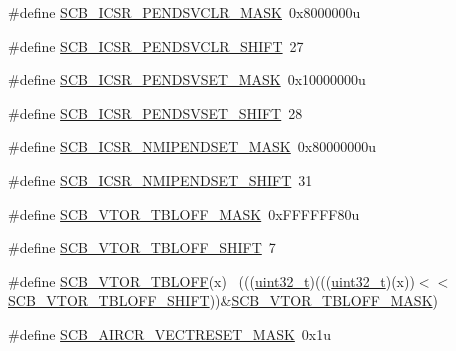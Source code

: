 \begin{DoxyCompactItemize}
\item 
\#define \hyperlink{group___s_c_b___register___masks_ga12a45a6af09cbefd431d033d8411220e}{S\+C\+B\+\_\+\+I\+C\+S\+R\+\_\+\+P\+E\+N\+D\+S\+V\+C\+L\+R\+\_\+\+M\+A\+SK}~0x8000000u
\item 
\#define \hyperlink{group___s_c_b___register___masks_gad7a5894ad98606b443ab6f1b52f2bc36}{S\+C\+B\+\_\+\+I\+C\+S\+R\+\_\+\+P\+E\+N\+D\+S\+V\+C\+L\+R\+\_\+\+S\+H\+I\+FT}~27
\item 
\#define \hyperlink{group___s_c_b___register___masks_ga5ed59a5d03a7d25ef76aa9d92e25e4a5}{S\+C\+B\+\_\+\+I\+C\+S\+R\+\_\+\+P\+E\+N\+D\+S\+V\+S\+E\+T\+\_\+\+M\+A\+SK}~0x10000000u
\item 
\#define \hyperlink{group___s_c_b___register___masks_ga76cddcbf872958b00237c662309251d2}{S\+C\+B\+\_\+\+I\+C\+S\+R\+\_\+\+P\+E\+N\+D\+S\+V\+S\+E\+T\+\_\+\+S\+H\+I\+FT}~28
\item 
\#define \hyperlink{group___s_c_b___register___masks_gab2a6cb5708895a81ec8826b8fa546145}{S\+C\+B\+\_\+\+I\+C\+S\+R\+\_\+\+N\+M\+I\+P\+E\+N\+D\+S\+E\+T\+\_\+\+M\+A\+SK}~0x80000000u
\item 
\#define \hyperlink{group___s_c_b___register___masks_ga8a185fc794df7e755e5f3a8b3a06d042}{S\+C\+B\+\_\+\+I\+C\+S\+R\+\_\+\+N\+M\+I\+P\+E\+N\+D\+S\+E\+T\+\_\+\+S\+H\+I\+FT}~31
\item 
\#define \hyperlink{group___s_c_b___register___masks_ga07fd57e90baff628af14394c8142dc27}{S\+C\+B\+\_\+\+V\+T\+O\+R\+\_\+\+T\+B\+L\+O\+F\+F\+\_\+\+M\+A\+SK}~0x\+F\+F\+F\+F\+F\+F80u
\item 
\#define \hyperlink{group___s_c_b___register___masks_gac6092f3c78a9f126c2d02740a7976708}{S\+C\+B\+\_\+\+V\+T\+O\+R\+\_\+\+T\+B\+L\+O\+F\+F\+\_\+\+S\+H\+I\+FT}~7
\item 
\#define \hyperlink{group___s_c_b___register___masks_ga0fc8974ae1755bc9819c97712403b828}{S\+C\+B\+\_\+\+V\+T\+O\+R\+\_\+\+T\+B\+L\+O\+FF}(x)                                          ~(((\hyperlink{_p_e___types_8h_a33594304e786b158f3fb30289278f5af}{uint32\+\_\+t})(((\hyperlink{_p_e___types_8h_a33594304e786b158f3fb30289278f5af}{uint32\+\_\+t})(x))$<$$<$\hyperlink{group___s_c_b___register___masks_gac6092f3c78a9f126c2d02740a7976708}{S\+C\+B\+\_\+\+V\+T\+O\+R\+\_\+\+T\+B\+L\+O\+F\+F\+\_\+\+S\+H\+I\+FT}))\&\hyperlink{group___s_c_b___register___masks_ga07fd57e90baff628af14394c8142dc27}{S\+C\+B\+\_\+\+V\+T\+O\+R\+\_\+\+T\+B\+L\+O\+F\+F\+\_\+\+M\+A\+SK})
\item 
\#define \hyperlink{group___s_c_b___register___masks_gac4c28207a4bc452bd147dd820037eb08}{S\+C\+B\+\_\+\+A\+I\+R\+C\+R\+\_\+\+V\+E\+C\+T\+R\+E\+S\+E\+T\+\_\+\+M\+A\+SK}~0x1u
$$
\end{DoxyCompactItemize}
